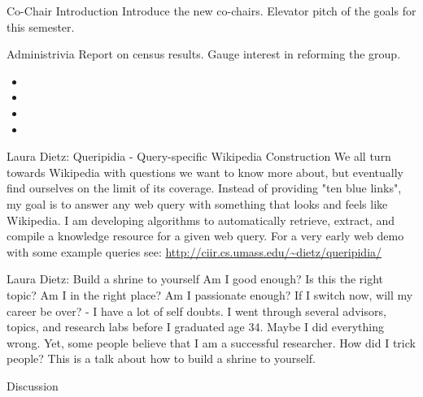 \documentclass{agenda}
\begin{document}
	\agendaheader{}
	
	\begin{agendaitem}{5}{Co-Chair Introduction}
		Introduce the new co-chairs. Elevator pitch of the goals for this semester.
	\end{agendaitem}
	
	\begin{agendaitem}{10}{Administrivia}
		Report on census results. Gauge interest in reforming the group.
		\begin{itemize}
			\item {}
			\item {}
			\item {}
			\item {}
		\end{itemize}
	\end{agendaitem}
	
	\begin{agendaitem}{20}{Laura Dietz:  Queripidia - Query-specific Wikipedia Construction}
		We all turn towards Wikipedia with questions we want to know more about, but eventually find ourselves on the limit of its coverage. Instead of providing "ten blue links", my goal is to answer any web query with something that looks and feels like Wikipedia. I am developing algorithms to automatically retrieve, extract, and compile a knowledge resource for a given web query. For a very early web demo with some example queries see: \url{http://ciir.cs.umass.edu/~dietz/queripidia/}
	\end{agendaitem}
	
	\begin{agendaitem}{15}{Laura Dietz: Build a shrine to yourself}
	Am I good enough? Is this the right topic? Am I in the right place? Am I passionate enough? If I switch now, will my career be over? - I have a lot of self doubts. I went through several advisors, topics, and research labs before I graduated age 34. Maybe I did everything wrong. Yet, some people believe that I am a successful researcher. How did I trick people? This is a talk about how to build a shrine to yourself.
	\end{agendaitem}
	
	\begin{agendaitem}{10}{Discussion}
	\end{agendaitem}
	
\end{document}
